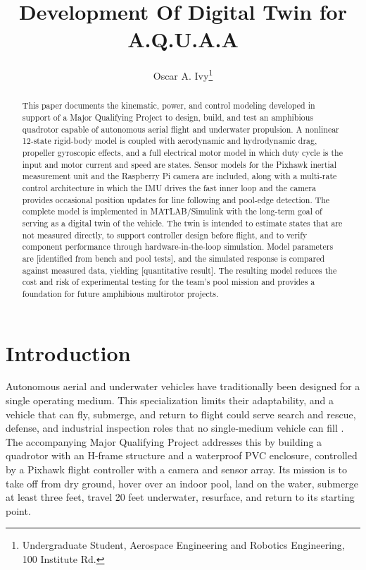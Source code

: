 \documentclass[conf]{new-aiaa}
\begin{document}
\title{Development Of Digital Twin for A.Q.U.A.A}

\author{%
  Oscar A. Ivy\footnote{Undergraduate Student, Aerospace Engineering and Robotics Engineering, 100 Institute Rd.}
}

\maketitle

\begin{abstract}
This paper documents the kinematic, power, and control modeling developed in
support of a Major Qualifying Project to design, build, and test an amphibious
quadrotor capable of autonomous aerial flight and underwater propulsion. A
nonlinear 12-state rigid-body model is coupled with aerodynamic and
hydrodynamic drag, propeller gyroscopic effects, and a full electrical motor
model in which duty cycle is the input and motor current and speed are states.
Sensor models for the Pixhawk inertial measurement unit and the
Raspberry Pi camera are included, along with a multi-rate control
architecture in which the IMU drives the fast inner loop and the camera
provides occasional position updates for line following and pool-edge
detection. The complete model is implemented in MATLAB/Simulink with the long-term goal of serving as a digital twin
of the vehicle. The twin is intended to estimate states that are not
measured directly, to support controller design before flight, and to verify
component performance through hardware-in-the-loop simulation. Model
parameters are [identified from bench and pool tests], and the simulated
response is compared against measured data, yielding [quantitative result].
The resulting model reduces the cost and risk of experimental testing for the
team's pool mission and provides a foundation for future amphibious multirotor
projects.
\end{abstract}
\tableofcontents

\section{Introduction}
Autonomous aerial and underwater vehicles have traditionally been designed for
a single operating medium. This specialization limits their adaptability, and
a vehicle that can fly, submerge, and return to flight could serve search and
rescue, defense, and industrial inspection roles that no single-medium vehicle
can fill \cite{2023amphibious,2024amphibious}. The accompanying Major
Qualifying Project addresses this by building a quadrotor with an H-frame
structure and a waterproof PVC enclosure, controlled by a Pixhawk flight
controller with a camera and sensor array. Its mission is to take off from dry
ground, hover over an indoor pool, land on the water, submerge at least three
feet, travel 20 feet underwater, resurface, and return to its starting point.
\end{document}
